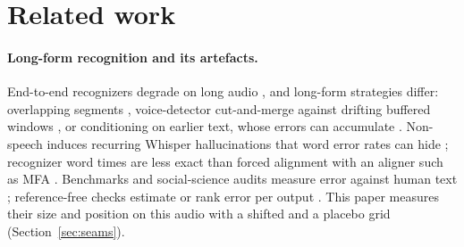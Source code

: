 
\section{Related work}
\label{sec:related}

\paragraph{Long-form recognition and its artefacts.} End-to-end recognizers degrade on long audio \cite{narayanan2019recognizing}, and long-form strategies differ: overlapping segments \cite{chiu2019comparison}, voice-detector cut-and-merge against drifting buffered windows \cite{bain2023whisperx}, or conditioning on earlier text, whose errors can accumulate \cite{ahn2026whispercd}. Non-speech induces recurring Whisper hallucinations \cite{baranski2025investigation,wang2025calmwhisper} that word error rates can hide \cite{frieske2024hallucinations}; recognizer word times are less exact than forced alignment \cite{rousso2024tradition} with an aligner such as MFA \cite{mcauliffe2017montreal}. Benchmarks and social-science audits measure error against human text \cite{delrio2021earnings,proksch2019testing}; reference-free checks estimate or rank error per output \cite{ali2020ewer2,yuksel2023norefer}. This paper measures their size and position on this audio with a shifted and a placebo grid (Section~\ref{sec:seams}).

